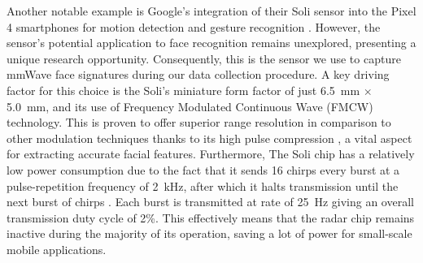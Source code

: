 \documentclass{mpaper}
\begin{document}
Another notable example is Google's integration of their Soli sensor into the Pixel 4 smartphones for motion detection and gesture recognition \cite{googleblog2020}. However, the sensor's potential application to face recognition remains unexplored, presenting a unique research opportunity. Consequently, this is the sensor we use to capture mmWave face signatures during our data collection procedure. A key driving factor for this choice is the Soli's miniature form factor of just \qty{6.5}{\mm} $\times$ \qty{5.0}{\mm}, and its use of Frequency Modulated Continuous Wave (FMCW) technology. This is proven to offer superior range resolution in comparison to other modulation techniques thanks to its high pulse compression \cite{mahafza2005radar}, a vital aspect for extracting accurate facial features. Furthermore, The Soli chip has a relatively low power consumption due to the fact that it sends 16 chirps every burst at a pulse-repetition frequency of \qty{2}{\kHz}, after which it halts transmission until the next burst of chirps \cite{hayashi2021radarnet, mitchell2023mmsense}. Each burst is transmitted at rate of \qty{25}{\Hz} giving an overall transmission duty cycle of 2\%. This effectively means that the radar chip remains inactive during the majority of its operation, saving a lot of power for small-scale mobile applications.
\end{document}
